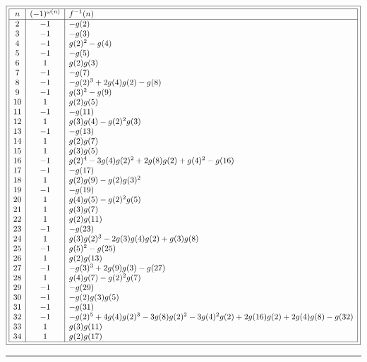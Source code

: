 \documentclass[11pt,reqno,a4letter]{article}
\numberwithin{figure}{section}
\numberwithin{table}{section}
\theoremstyle{plain}
\numberwithin{theorem}{section}
\theoremstyle{definition}
\newcommand{\NBRef}[1]{
     \todo[linecolor=green!85!white,backgroundcolor=orange!50!white,bordercolor=blue!30!black,textcolor=cyan!15!black,shadow,size=\small,fancyline]{
     \color{NBRefColor}{\textbf{#1}
     }
     }
}
\begin{document}
\begin{table}[h!]

\centering

\tiny
\begin{equation*}
\boxed{
\begin{array}{|c|c|l|} \hline 
n & (-1)^{\omega(n)} & f^{-1}(n) \\ \hline 
 2 & -1 & -g(2) \\
 3 & -1 & -g(3) \\
 4 & -1 & g(2)^2-g(4) \\
 5 & -1 & -g(5) \\
 6 & 1 & g(2) g(3) \\
 7 & -1 & -g(7) \\
 8 & -1 & -g(2)^3+2 g(4) g(2)-g(8) \\
 9 & -1 & g(3)^2-g(9) \\
 10 & 1 & g(2) g(5) \\
 11 & -1 & -g(11) \\
 12 & 1 & g(3) g(4)-g(2)^2 g(3) \\
 13 & -1 & -g(13) \\
 14 & 1 & g(2) g(7) \\
 15 & 1 & g(3) g(5) \\
 16 & -1 & g(2)^4-3 g(4) g(2)^2+2 g(8) g(2)+g(4)^2-g(16) \\
 17 & -1 & -g(17) \\
 18 & 1 & g(2) g(9)-g(2) g(3)^2 \\
 19 & -1 & -g(19) \\
 20 & 1 & g(4) g(5)-g(2)^2 g(5) \\
 21 & 1 & g(3) g(7) \\
 22 & 1 & g(2) g(11) \\
 23 & -1 & -g(23) \\
 24 & 1 & g(3) g(2)^3-2 g(3) g(4) g(2)+g(3) g(8) \\
 25 & -1 & g(5)^2-g(25) \\
 26 & 1 & g(2) g(13) \\
 27 & -1 & -g(3)^3+2 g(9) g(3)-g(27) \\
 28 & 1 & g(4) g(7)-g(2)^2 g(7) \\
 29 & -1 & -g(29) \\
 30 & -1 & -g(2) g(3) g(5) \\
 31 & -1 & -g(31) \\
 32 & -1 & -g(2)^5+4 g(4) g(2)^3-3 g(8) g(2)^2-3 g(4)^2 g(2)+2 g(16) g(2)+2 g(4) g(8)-g(32) \\
 33 & 1 & g(3) g(11) \\
 34 & 1 & g(2) g(17) \\
   \hline 
\end{array}
}
\end{equation*} 

\bigskip\hrule\smallskip 

\caption*{\textbf{\rm \bf Table \thesubsection:} 
          \textbf{Dirichlet inverse functions of multiplicative arithmetic functions.} 
          The table provides a list of the Dirichlet inverse functions of $g(n)$ for 
          $g$ multiplicative such that $g(1) = 1$. } 

\end{table}

\NBRef{A04-2020-04026}

\newpage
\setcounter{section}{0}
\renewcommand{\thesection}{Appendix \Alph{section}}
\renewcommand{\thesubsection}{\Alph{section}.\arabic{subsection}}
\end{document}
